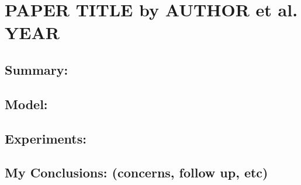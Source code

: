 \section{PAPER TITLE by AUTHOR et al. YEAR}

\subsection{Summary:}

\subsection{Model:}

\subsection{Experiments:}

\subsection{My Conclusions: (concerns, follow up, etc)}


